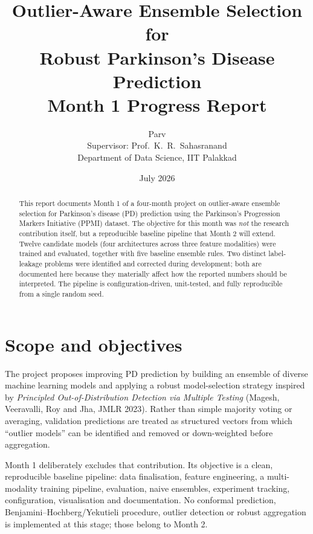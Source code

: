 \documentclass[11pt,a4paper]{article}
\title{\textbf{Outlier-Aware Ensemble Selection for\\ Robust Parkinson's Disease Prediction}\\[0.6em]
       \large Month 1 Progress Report}
\author{Parv\\[0.3em]
        \small Supervisor: Prof.\ K.~R.\ Sahasranand\\
        \small Department of Data Science, IIT Palakkad}
\date{July 2026}
\begin{document}
\maketitle

\begin{abstract}
\noindent
This report documents Month 1 of a four-month project on outlier-aware ensemble
selection for Parkinson's disease (PD) prediction using the Parkinson's
Progression Markers Initiative (PPMI) dataset. The objective for this month was
\emph{not} the research contribution itself, but a reproducible baseline
pipeline that Month 2 will extend. Twelve candidate models (four architectures
across three feature modalities) were trained and evaluated, together with five
baseline ensemble rules. Two distinct label-leakage problems were identified and
corrected during development; both are documented here because they materially
affect how the reported numbers should be interpreted. The pipeline is
configuration-driven, unit-tested, and fully reproducible from a single random
seed.
\end{abstract}

\vspace{0.5em}

\section{Scope and objectives}

The project proposes improving PD prediction by building an ensemble of diverse
machine learning models and applying a robust model-selection strategy inspired
by \emph{Principled Out-of-Distribution Detection via Multiple Testing}
(Magesh, Veeravalli, Roy and Jha, JMLR 2023). Rather than simple majority voting
or averaging, validation predictions are treated as structured vectors from
which ``outlier models'' can be identified and removed or down-weighted before
aggregation.

Month 1 deliberately excludes that contribution. Its objective is a clean,
reproducible baseline pipeline: data finalisation, feature engineering, a
multi-modality training pipeline, evaluation, naive ensembles, experiment
tracking, configuration, visualisation and documentation. No conformal
prediction, Benjamini--Hochberg/Yekutieli procedure, outlier detection or robust
aggregation is implemented at this stage; those belong to Month 2.
\end{document}
